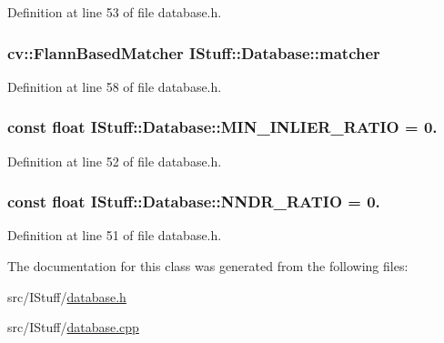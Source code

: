 Definition at line 53 of file database.\-h.

\hypertarget{class_i_stuff_1_1_database_a871b6feeaa1b3d1e75d3b4b8edb86a84}{
\subsubsection[{matcher}]{\setlength{\rightskip}{0pt plus 5cm}cv\-::\-Flann\-Based\-Matcher I\-Stuff\-::\-Database\-::matcher\hspace{0.3cm}{\ttfamily [private]}}}\label{class_i_stuff_1_1_database_a871b6feeaa1b3d1e75d3b4b8edb86a84}


Definition at line 58 of file database.\-h.

\hypertarget{class_i_stuff_1_1_database_a11bb91e98d0c0a6640b69c699f22999a}{
\subsubsection[{M\-I\-N\-\_\-\-I\-N\-L\-I\-E\-R\-\_\-\-R\-A\-T\-I\-O}]{\setlength{\rightskip}{0pt plus 5cm}const float I\-Stuff\-::\-Database\-::\-M\-I\-N\-\_\-\-I\-N\-L\-I\-E\-R\-\_\-\-R\-A\-T\-I\-O = 0.\hspace{0.3cm}{\ttfamily [private]}}}\label{class_i_stuff_1_1_database_a11bb91e98d0c0a6640b69c699f22999a}


Definition at line 52 of file database.\-h.

\hypertarget{class_i_stuff_1_1_database_ade8d4afb9ec5e100de098777257d192c}{
\subsubsection[{N\-N\-D\-R\-\_\-\-R\-A\-T\-I\-O}]{\setlength{\rightskip}{0pt plus 5cm}const float I\-Stuff\-::\-Database\-::\-N\-N\-D\-R\-\_\-\-R\-A\-T\-I\-O = 0.\hspace{0.3cm}{\ttfamily [private]}}}\label{class_i_stuff_1_1_database_ade8d4afb9ec5e100de098777257d192c}


Definition at line 51 of file database.\-h.



The documentation for this class was generated from the following files\-:\begin{DoxyCompactItemize}
\item 
src/\-I\-Stuff/\hyperlink{database_8h}{database.\-h}\item 
src/\-I\-Stuff/\hyperlink{database_8cpp}{database.\-cpp}\end{DoxyCompactItemize}
